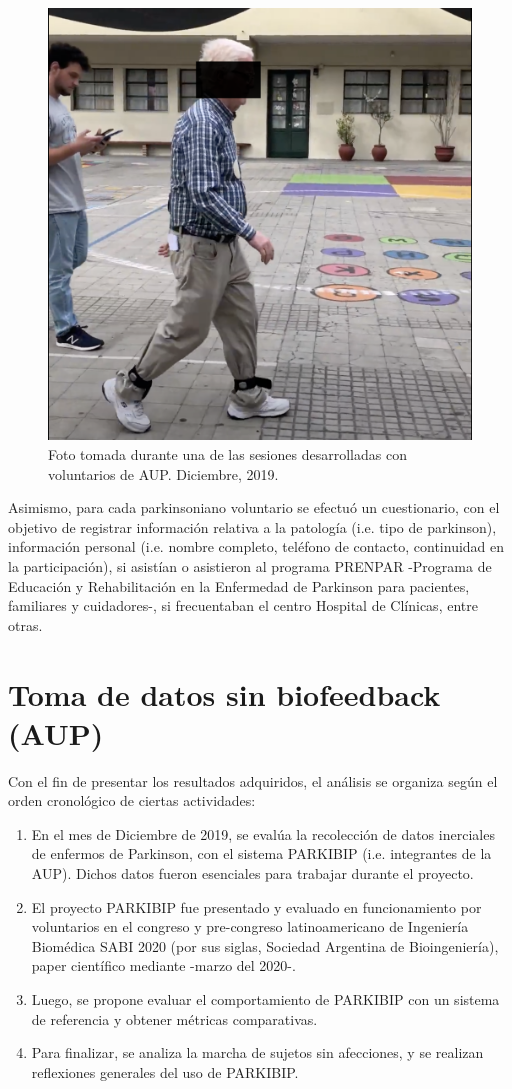 \begin{figure}[h!]
\centering
\includegraphics[clip,width=0.6 \columnwidth]{TESIS/imagenes/chap06/aup-session-image.png}
\caption{Foto tomada durante una de las sesiones desarrolladas con voluntarios de AUP. Diciembre, 2019.}
\label{fig:real-session-aup}
\end{figure}

Asimismo, para cada parkinsoniano voluntario se efectuó un cuestionario, con el objetivo de registrar información relativa a la patología (i.e. tipo de parkinson), información personal (i.e. nombre completo,  teléfono de contacto, continuidad en la participación), si asistían o asistieron al programa PRENPAR -Programa de Educación y Rehabilitación en la Enfermedad de Parkinson para pacientes, familiares y cuidadores-, si frecuentaban el centro Hospital de Clínicas, entre otras.

\newpage

\section{Toma de datos sin biofeedback (AUP)}

Con el fin de presentar los resultados adquiridos, el análisis se organiza según el orden cronológico de ciertas actividades:
\begin{enumerate}
    \item En el mes de Diciembre de 2019, se evalúa la recolección de datos inerciales de enfermos de Parkinson, con el sistema PARKIBIP (i.e. integrantes  de la AUP). Dichos datos fueron esenciales para trabajar durante el proyecto.
    \item El proyecto PARKIBIP fue presentado y evaluado en funcionamiento por voluntarios en el congreso y pre-congreso latinoamericano de Ingeniería Biomédica SABI 2020 (por sus siglas, Sociedad Argentina de Bioingeniería), paper científico mediante -marzo del 2020-.
    \item Luego, se propone evaluar el comportamiento de PARKIBIP con un sistema de referencia y obtener métricas comparativas.
    \item Para finalizar, se analiza la marcha de sujetos sin afecciones, y se realizan reflexiones generales del uso de PARKIBIP.
\end{enumerate}

